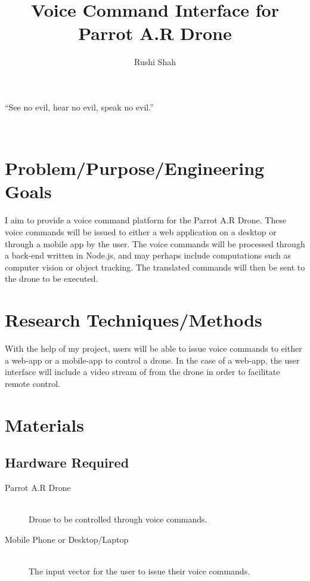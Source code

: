 \documentclass{article}
\title{Voice Command Interface for Parrot A.R Drone}
\author{Rushi Shah}
\begin{document}
	\begin{singlespace}
		\maketitle
		\setlength{\epigraphwidth}{0.35\textwidth}
		\epigraph{``See no evil, hear no evil, speak no evil.''}{🙈🙉🙊}
	\end{singlespace}


	\section{Problem/Purpose/Engineering Goals}
	I aim to provide a voice command platform for the Parrot A.R Drone. These voice commands will be issued to either a web application on a desktop or through a mobile app by the user. The voice commands will be processed through a back-end written in Node.js, and may perhaps include computations such as computer vision or object tracking. The translated commands will then be sent to the drone to be executed.


	\section{Research Techniques/Methods}
	With the help of my project, users will be able to issue voice commands to either a web-app or a mobile-app to control a drone. In the case of a web-app, the user interface will include a video stream of from the drone in order to facilitate remote control. 

	\section{Materials}

	\subsection{Hardware Required}
	\begin{description}
	  \item[Parrot A.R Drone] \hfill \\
	  Drone to be controlled through voice commands. 
	  \item[Mobile Phone or Desktop/Laptop] \hfill \\
	  The input vector for the user to issue their voice commands. 
	\end{description}
\end{document}

